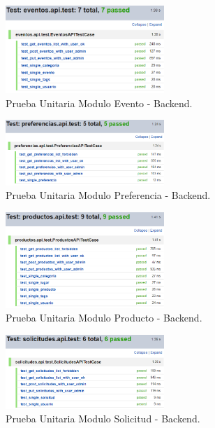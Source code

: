 \documentclass[12pt,letterpaper,openany]{book}
\begin{document}
\begin{figure}[H]
\begin{center}
\includegraphics[width=6cm]{./imagenes/Test/Backend/Test__eventos_api_test}
\caption{Prueba Unitaria Modulo Evento - Backend.}
\end{center}
\end{figure}

\begin{figure}[H]
\begin{center}
\includegraphics[width=6cm]{./imagenes/Test/Backend/Test__preferencias_api_test}
\caption{Prueba Unitaria Modulo Preferencia - Backend.}
\end{center}
\end{figure}

\begin{figure}[H]
\begin{center}
\includegraphics[width=6cm]{./imagenes/Test/Backend/Test__productos_api_test}
\caption{Prueba Unitaria Modulo Producto - Backend.}
\end{center}
\end{figure}

\begin{figure}[H]
\begin{center}
\includegraphics[width=6cm]{./imagenes/Test/Backend/Test__solicitudes_api_test}
\caption{Prueba Unitaria Modulo Solicitud - Backend.}
\end{center}
\end{figure}
\end{document}
